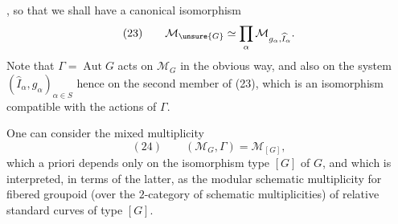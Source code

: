 ,  so that we shall have a canonical isomorphism
\[
(23)\qquad\mathcal M_{\unsure{G}}\simeq\prod_\alpha\mathcal M_{g_\alpha,\widehat I_\alpha}.
\]
Note that $\Gamma=\operatorname{Aut}G$ acts on $\mathcal M_G$ in the obvious way, and also on the system $(\widehat I_\alpha,g_\alpha)_{\alpha\in S}$ hence on the second member of (23), which is an isomorphism compatible with the actions of $\Gamma$.

One can consider the mixed multiplicity
\[
(24)\qquad(\mathcal M_G,\Gamma)=\mathcal M_{[G]},
\]
which a priori depends only on the isomorphism type $[G]$ of $G$, and which is interpreted, in terms of the latter, as the modular schematic multiplicity for  fibered groupoid (over the $2$-category of schematic multiplicities) of relative standard curves of type $[G]$.
